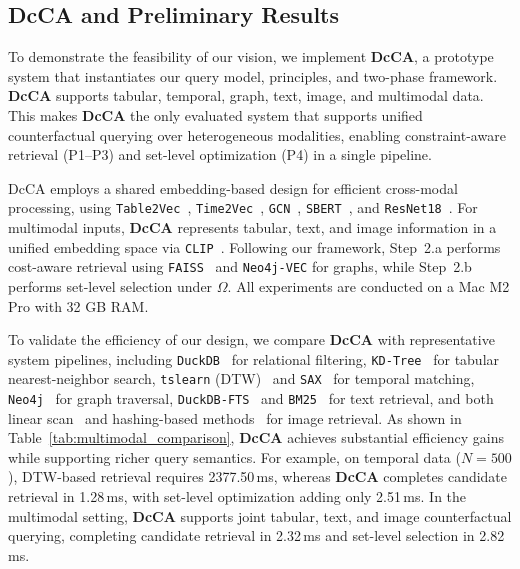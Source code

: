 \subsection{DcCA and Preliminary Results}



To demonstrate the feasibility of our vision, we implement \textbf{DcCA}, a prototype system that instantiates our query model, principles, and two-phase framework. \textbf{DcCA} supports tabular, temporal, graph, text, image, and multimodal data. This makes \textbf{DcCA} the only evaluated system that supports unified counterfactual querying over heterogeneous modalities, enabling constraint-aware retrieval (P1--P3) and set-level optimization (P4) in a single pipeline.

DcCA employs a shared embedding-based design for efficient cross-modal processing, using \texttt{Table2Vec}~\cite{zhang2019table2vec}, \texttt{Time2Vec}~\cite{kazemi2019time2vec}, \texttt{GCN}~\cite{kipf2016semi}, \texttt{SBERT}~\cite{reimers2019sentence}, and \texttt{ResNet18}~\cite{he2016deep}. For multimodal inputs, \textbf{DcCA} represents tabular, text, and image information in a unified embedding space via \texttt{CLIP}~\cite{radford2021learning}. Following our framework, Step~2.a performs cost-aware retrieval using \texttt{FAISS}~\cite{douze2025faiss} and \texttt{Neo4j-VEC} for graphs, while Step~2.b performs set-level selection under $\Omega$. All experiments are conducted on a Mac M2 Pro with 32 GB RAM.

To validate the efficiency of our design, we compare \textbf{DcCA} with representative system pipelines, including \texttt{DuckDB}~\cite{raasveldt2019duckdb} for relational filtering, \texttt{KD-Tree}~\cite{ram2019revisiting} for tabular nearest-neighbor search, \texttt{tslearn} (DTW)~\cite{tavenard2020tslearn} and \texttt{SAX}~\cite{yu2019novel} for temporal matching, \texttt{Neo4j}~\cite{neo4jVector} for graph traversal, \texttt{DuckDB-FTS}~\cite{raasveldt2019duckdb} and \texttt{BM25}~\cite{robertson2009probabilistic} for text retrieval, and both linear scan~\cite{ibrahim2017transforming} and hashing-based methods~\cite{wang2022dhash} for image retrieval. As shown in Table~\ref{tab:multimodal_comparison}, \textbf{DcCA} achieves substantial efficiency gains while supporting richer query semantics. For example, on temporal data ($N=500$), DTW-based retrieval requires 2377.50\,ms, whereas \textbf{DcCA} completes candidate retrieval in 1.28\,ms, with set-level optimization adding only 2.51\,ms. In the multimodal setting, \textbf{DcCA} supports joint tabular, text, and image counterfactual querying, completing candidate retrieval in 2.32\,ms and set-level selection in 2.82\,ms.

